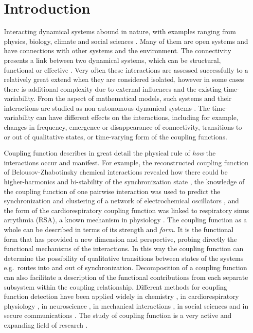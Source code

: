 \documentclass[pre,aps,twocolumn,showpacs]{revtex4}
\begin{document}

\section{Introduction}\label{sec1:Intro}

Interacting dynamical systems abound in nature, with examples ranging from physics, biology, climate and social sciences \cite{Pikovsky:01,Strogatz:03b,Haken:83}. Many of them  are open systems and have connections with other systems and the environment. The connectivity presents a link between two dynamical systems, which can be structural, functional or effective \cite{Friston:11}.  Very often these interactions are assessed successfully to a relatively great extend when they are considered isolated, however in some cases there is additional complexity due to external influences and the existing time-variability. From the aspect of mathematical models, such systems and their interactions are studied as non-autonomous dynamical systems \cite{Kloeden:11,Stankovski:13a,Suprunenko:13,Clemson:14b,Lancaster:15}. The time-variability can have different effects on the interactions, including for example, changes in frequency, emergence or disappearance of connectivity, transitions to or out of qualitative states, or time-varying form of the coupling functions.


Coupling function describes in great detail the physical rule of \emph{how} the interactions occur and manifest. For example, the reconstructed coupling function of Belousov-Zhabotinsky chemical interactions revealed how there could be higher-harmonics and bi-stability of the synchronization state \cite{Miyazaki:06}, the knowledge of the coupling function of one pairwise interaction was used to predict the synchronization and clustering of a network of electrochemical oscillators \cite{Kiss:05}, and the form of the cardiorespiratory coupling function was linked to respiratory sinus arrythmia (RSA), a known mechanism in physiology \cite{Iatsenko:13a,Kralemann:13b}.
The coupling function as a whole can be described in terms of its  strength and {\it form}. It is the functional form that has provided a new dimension and perspective, probing directly the functional mechanisms of the interactions. In this way the coupling function can determine the possibility of qualitative transitions between states of the systems e.g.\ routes into and out of synchronization. Decomposition of a coupling function can also facilitate a description of the functional contributions from each separate subsystem within the coupling relationship. Different methods for coupling function detection have been applied widely in chemistry \cite{Kiss:07,Miyazaki:06,Tokuda:07,Kiss:05,Blaha:11}, in cardiorespiratory physiology \cite{Kralemann:13b,Stankovski:12b,Iatsenko:13a}, in neuroscience \cite{Stankovski:15a,Stankovski:16,Wilting:15}, in mechanical interactions \cite{Kralemann:08}, in social sciences \cite{Ranganathan:14} and in secure communications \cite{Stankovski:14a}. The study of coupling function is a very active and expanding field of research \cite{Stankovski:16b}.
\end{document}
